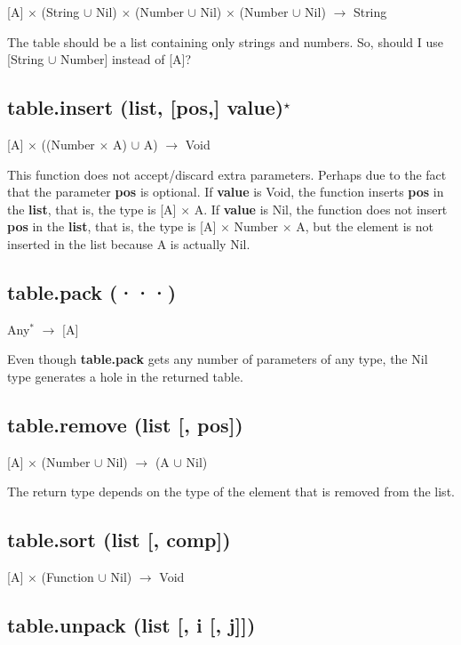 \documentclass[12pt]{article}
\begin{document}
[A] $\times$
(String $\cup$ Nil) $\times$
(Number $\cup$ Nil) $\times$
(Number $\cup$ Nil) $\rightarrow$
String

The table should be a list containing only strings and numbers.
So, should I use [String $\cup$ Number] instead of [A]?

\subsection{table.insert (list, [pos,] value)$^\star$}

[A] $\times$ ((Number $\times$ A) $\cup$ A) $\rightarrow$ Void

This function does not accept/discard extra parameters.
Perhaps due to the fact that the parameter \textbf{pos} is optional.
If \textbf{value} is Void, the function inserts \textbf{pos} in the
\textbf{list}, that is, the type is [A] $\times$ A.
If \textbf{value} is Nil, the function does not insert \textbf{pos}
in the \textbf{list}, that is, the type is
[A] $\times$ Number $\times$ A, but the element is not inserted in
the list because A is actually Nil.

\subsection{table.pack (···)}

Any$^*$ $\rightarrow$ [A]

Even though \textbf{table.pack} gets any number of parameters of
any type, the Nil type generates a hole in the returned table.

\subsection{table.remove (list [, pos])}

[A] $\times$ (Number $\cup$ Nil) $\rightarrow$ (A $\cup$ Nil)

The return type depends on the type of the element that is removed
from the list.

\subsection{table.sort (list [, comp])}

[A] $\times$ (Function $\cup$ Nil) $\rightarrow$ Void

\subsection{table.unpack (list [, i [, j]])}
\end{document}
